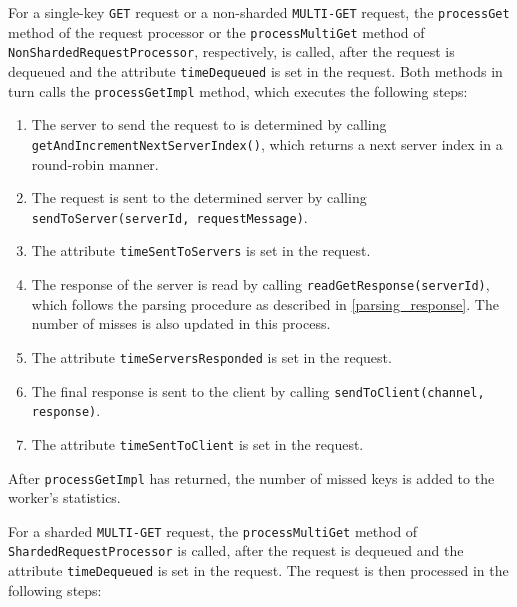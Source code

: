 For a single-key \texttt{GET} request or a non-sharded \texttt{MULTI-GET} request, the \texttt{processGet} method of the request processor or the \texttt{processMultiGet} method of \texttt{NonShardedRequestProcessor}, respectively, is called, after the request is dequeued and the attribute \texttt{timeDequeued} is set in the request. Both methods in turn calls the \texttt{processGetImpl} method, which executes the following steps:

\begin{enumerate}[noitemsep,topsep=0pt]
\item The server to send the request to is determined by calling \texttt{getAndIncrementNextServerIndex()}, which returns a next server index in a round-robin manner.
\item The request is sent to the determined server by calling \texttt{sendToServer(serverId, requestMessage)}.
\item The attribute \texttt{timeSentToServers} is set in the request.
\item The response of the server is read by calling \texttt{readGetResponse(serverId)}, which follows the parsing procedure as described in \ref{parsing_response}. The number of misses is also updated in this process.
\item The attribute \texttt{timeServersResponded} is set in the request.
\item The final response is sent to the client by calling \texttt{sendToClient(channel, response)}.
\item The attribute \texttt{timeSentToClient} is set in the request.
\end{enumerate}

After \texttt{processGetImpl} has returned, the number of missed keys is added to the worker's statistics.


For a sharded \texttt{MULTI-GET} request, the \texttt{processMultiGet} method of \texttt{ShardedRequestProcessor} is called, after the request is dequeued and the attribute \texttt{timeDequeued} is set in the request. The request is then processed in the following steps:

